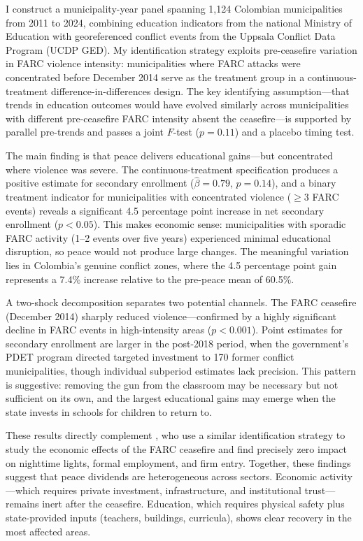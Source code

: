 \documentclass[12pt]{article}
\begin{document}
I construct a municipality-year panel spanning 1,124 Colombian municipalities from 2011 to 2024, combining education indicators from the national Ministry of Education with georeferenced conflict events from the Uppsala Conflict Data Program (UCDP GED). My identification strategy exploits pre-ceasefire variation in FARC violence intensity: municipalities where FARC attacks were concentrated before December 2014 serve as the treatment group in a continuous-treatment difference-in-differences design. The key identifying assumption---that trends in education outcomes would have evolved similarly across municipalities with different pre-ceasefire FARC intensity absent the ceasefire---is supported by parallel pre-trends and passes a joint $F$-test ($p=0.11$) and a placebo timing test.

The main finding is that peace delivers educational gains---but concentrated where violence was severe. The continuous-treatment specification produces a positive estimate for secondary enrollment ($\hat{\beta}=0.79$, $p=0.14$), and a binary treatment indicator for municipalities with concentrated violence ($\geq$3 FARC events) reveals a significant 4.5 percentage point increase in net secondary enrollment ($p<0.05$). This makes economic sense: municipalities with sporadic FARC activity (1--2 events over five years) experienced minimal educational disruption, so peace would not produce large changes. The meaningful variation lies in Colombia's genuine conflict zones, where the 4.5 percentage point gain represents a 7.4\% increase relative to the pre-peace mean of 60.5\%.

A two-shock decomposition separates two potential channels. The FARC ceasefire (December 2014) sharply reduced violence---confirmed by a highly significant decline in FARC events in high-intensity areas ($p<0.001$). Point estimates for secondary enrollment are larger in the post-2018 period, when the government's PDET program directed targeted investment to 170 former conflict municipalities, though individual subperiod estimates lack precision. This pattern is suggestive: removing the gun from the classroom may be necessary but not sufficient on its own, and the largest educational gains may emerge when the state invests in schools for children to return to.

These results directly complement \citet{fajardo2023peace}, who use a similar identification strategy to study the economic effects of the FARC ceasefire and find precisely zero impact on nighttime lights, formal employment, and firm entry. Together, these findings suggest that peace dividends are heterogeneous across sectors. Economic activity---which requires private investment, infrastructure, and institutional trust---remains inert after the ceasefire. Education, which requires physical safety plus state-provided inputs (teachers, buildings, curricula), shows clear recovery in the most affected areas.
\end{document}
